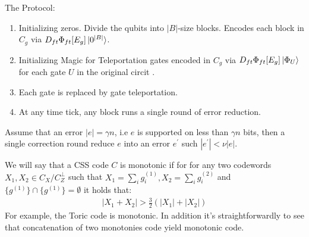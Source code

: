 \documentclass[manuscript,screen,review]{acmart}
\begin{document}
The Protocol:
\begin{enumerate}
  \item Initializing zeros. Divide the qubits into $|B|$-size blocks. Encodes each block in $C_{g}$ via $D_{ft} \Phi_{ft}[E_{g}] \ket{0^{|B|}}$.
  \item Initializing Magic for Teleportation gates encoded in $C_{g}$ via $D_{ft} \Phi_{ft}[E_{g}] \ket{\Phi_{U}}$ for each gate $U$ in the original circit .
  \item Each gate is replaced by gate teleportation.  
  \item At any time tick, any block runs a single round of error reduction.  
\end{enumerate}


\begin{claim}
  \label{claim:error} 
  Assume that an error $|e| = \gamma n $, i.e $e$ is supported on less than $\gamma n$ bits, then a single correction round reduce $e$ into an error $e^\prime$ such $|e^{\prime}| < \nu |e|$. 
\end{claim}


\begin{definition}
  \label{def:mono} We will say that a CSS code $C$ is monotonic if for for any two codewords $X_{1} , X_{2} \in C_{X}/C_{Z}^{\perp}$ such that $X_{1} = \sum_{i}{g^{(1)}_{i}},X_{2} = \sum_{i}{g^{(2)}_{i}}$ and $\{g^{(1)}\} \cap   \{g^{(1)}\} = \emptyset$ it holds that: 
  \begin{equation*}
    \begin{split}
      | X_{1} + X_{2} | > \frac{3}{2} \left(|X_{1}| + |X_{2}|\right)
    \end{split}
  \end{equation*}
  For example, the Toric code is monotonic. In addition it's straightforwardly to see that concatenation of two monotonies code yield monotonic code.
\end{definition}
\end{document}
